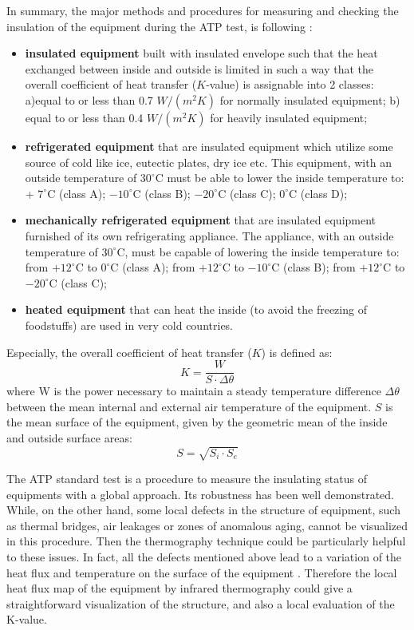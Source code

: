 In summary, the major methods and procedures for measuring and checking the insulation of the equipment during the ATP test, is following \citep{rossi2009k}: 
\begin{itemize}
	\item \textbf{insulated equipment} built with insulated envelope such that the heat exchanged between inside and outside is limited in such a way that the overall coefficient of heat transfer ($K$-value) is assignable into 2 classes: a)equal to or less than 0.7 $W/(m^2 K)$ for normally insulated equipment; b) equal to or less than 0.4 $W/(m^2 K)$ for heavily insulated equipment; 
	
	\item\textbf{refrigerated equipment} that are insulated equipment which utilize some source of cold like ice, eutectic plates, dry ice etc. This equipment, with an outside temperature of $30^{\circ}$C must be able to lower the inside temperature to: + $7^{\circ}$C (class A); $-10^{\circ}$C (class B); $-20^{\circ}$C (class C); $0^{\circ}$C (class D); 
	
	\item \textbf{mechanically refrigerated equipment} that  are  insulated  equipment  furnished  of  its  own  refrigerating appliance.  The  appliance,  with  an  outside  temperature  of  $30^{\circ}$C,  must  be  capable  of  lowering  the  inside temperature to: from $+12^{\circ}$C to $0^{\circ}$C (class A); from $+ 12^{\circ}$C to $-10^{\circ}$C (class B); from $+ 12^{\circ}$C to $- 20^{\circ}$C (class C); 
	
	\item \textbf{heated  equipment} that  can  heat  the  inside  (to  avoid  the  freezing  of  foodstuffs)  are  used  in  very  cold countries.
\end{itemize}
Especially, the overall coefficient of heat transfer ($K$) is defined as:
\begin{equation}
K = \frac{W}{S\cdot \Delta \theta}
\end{equation}
where W is  the  power  necessary  to  maintain  a  steady  temperature  difference $\Delta \theta$ between  the  mean internal and external air temperature of the equipment. $S$ is the mean surface of the equipment, given by the geometric mean of the inside and outside surface areas:
\begin{equation}
S = \sqrt{S_i \cdot S_e}
\end{equation}

The ATP standard test is a procedure to measure the insulating status of equipments with a global approach. Its robustness has been well demonstrated. While, on the other hand, some local defects in the structure of equipment, such as thermal bridges, air leakages or zones of anomalous aging, cannot be visualized in this procedure. Then the thermography technique could be particularly helpful to these issues. In fact, all the defects mentioned above lead to a variation of the heat flux and temperature on the surface of the equipment \citep{grinzatoquality,grinzato1comparison}. Therefore the local heat flux map of the equipment by infrared thermography could give a straightforward visualization of the structure, and also a local evaluation of the K-value.

